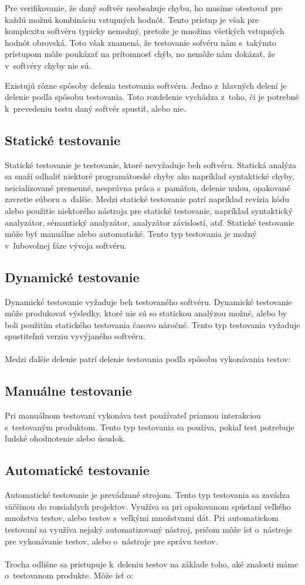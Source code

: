 Pre verifikovanie, že daný softvér neobsahuje chybu, ho musíme otestovať pre každú možnú kombináciu vstupných hodnôt.
Tento prístup je však pre komplexitu softvéru typicky nemožný, pretože je množina všetkých vstupných
hodnôt obrovská. Toto však znamená, že testovanie sofvéru nám s~takýmto prístupom môže poukázať na prítomnosť chýb, no nemôže nám
dokázať, že v~softvéry chyby nie sú.


Existujú rôzne spôsoby delenia testovania softvéru. Jedno z~hlavných delení je delenie podľa spôsobu testovania.
Toto rozdelenie vychádza z~toho, či je potrebné k~prevedeniu testu daný softvér spustiť, alebo nie.
\subsection*{Statické testovanie}
Statické testovanie je testovanie, ktoré nevyžaduje beh softvéru. Statická analýza sa snaží odhaliť niektoré
programátorské chyby ako napríklad syntaktické chyby, neicializované premenné, nesprávna práca s~pamäťou, delenie nulou, opakované zavretie súboru a~ďalšie. 
Medzi statické testovanie patrí napríklad revízia kódu alebo použitie niektorého nástroja pre statické testovanie, napríklad syntaktický analyzátor, sémantický
analyzátor, analyzátor závislostí, atď. Statické testovanie môže byť manuálne alebo automatické. Tento typ testovania je možný v~ľubovolnej fáze vývoja softvéru.
\subsection*{Dynamické testovanie}
Dynamické testovanie vyžaduje beh testovaného softvéru. Dynamické testovanie môže produkovať výsledky, ktoré nie sú so statickou analýzou možné, alebo 
by boli použitím statického testovania časovo náročné. Tento typ testovania vyžaduje spustiteľnú verziu vyvýjaného softvéru.
\\
\\
Medzi ďalšie delenie patrí delenie testovania podľa spôsobu vykonávania testov:
\subsection*{Manuálne testovanie}
Pri manuálnom testovaní vykonáva test používateľ priamou interakciou s~testovaným produktom. 
Tento typ testovania sa používa, pokiaľ test potrebuje ľudské ohodnotenie alebo úsudok.

\subsection*{Automatické testovanie}
Automatické testovanie je prevádzané strojom.
Tento typ testovania sa zavádza väčšinou do rozsiahlych projektov.
Využíva sa pri opakovanom spúsťaní veľkého množstva testov, alebo testov s~veľkými množstvami dát.
Pri automatickom testovaní sa využíva nejaký automatizovaný nástroj, pričom môže ísť o~nástroje 
pre vykonávanie testov, alebo o~nástroje pre správu testov.
\\
\\
Trocha odlišne sa pristupuje k~deleniu testov na základe toho, aké znalosti máme o~testovanom produkte.
Môže ísť o:
